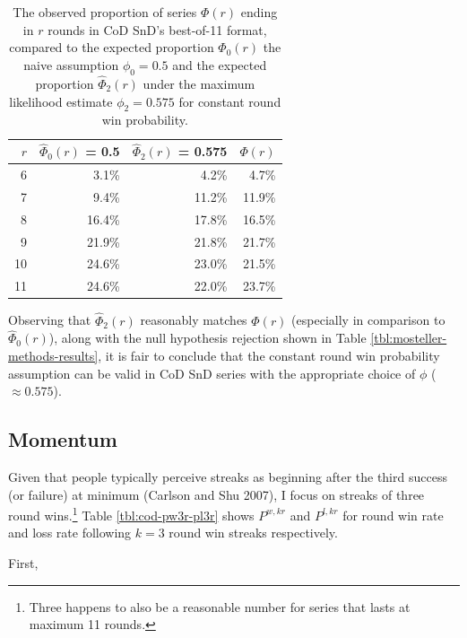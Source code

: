 \documentclass{article}
\begin{document}
\begin{longtable}[]{@{}rrrr@{}}
\caption{The observed proportion of series $\Phi(r)$ ending in $r$ rounds in CoD SnD's best-of-11 format, compared to the expected proportion $\hat{\Phi}_0(r)$ the naive assumption $\phi_0 = 0.5$ and the expected proportion $\hat{\Phi}_2(r)$ under the maximum likelihood estimate $\phi_2 = 0.575$ for constant round win probability.}\label{tbl:expected-series-lengths-alternative-ps} \\
\toprule()
$r$ & $\hat{\Phi}_0(r)$ = 0.5 & $\hat{\Phi}_2(r)$ = 0.575 & $\Phi(r)$ \\
\midrule()
\endhead
6 & 3.1\% & 4.2\% & 4.7\% \\
7 & 9.4\% & 11.2\% & 11.9\% \\
8 & 16.4\% & 17.8\% & 16.5\% \\
9 & 21.9\% & 21.8\% & 21.7\% \\
10 & 24.6\% & 23.0\% & 21.5\% \\
11 & 24.6\% & 22.0\% & 23.7\% \\
\bottomrule()
\end{longtable}

Observing that \(\hat{\Phi}_2(r)\) reasonably matches \(\Phi(r)\)
(especially in comparison to \(\hat{\Phi}_0(r)\)), along with the null
hypothesis rejection shown in Table \ref{tbl:mosteller-methods-results},
it is fair to conclude that the constant round win probability
assumption can be valid in CoD SnD series with the appropriate choice of
\(\phi\) (\(\approx 0.575\)).

\hypertarget{sec:results-momentum}{%
\subsection{Momentum}\label{sec:results-momentum}}

Given that people typically perceive streaks as beginning after the
third success (or failure) at minimum (Carlson and Shu 2007), I focus on
streaks of three round wins.\footnote{Three happens to also be a
  reasonable number for series that lasts at maximum 11 rounds.} Table
\ref{tbl:cod-pw3r-pl3r} shows \(P^{w,kr}\) and \(P^{l,kr}\) for round
win rate and loss rate following \(k = 3\) round win streaks
respectively.

First,
\end{document}

